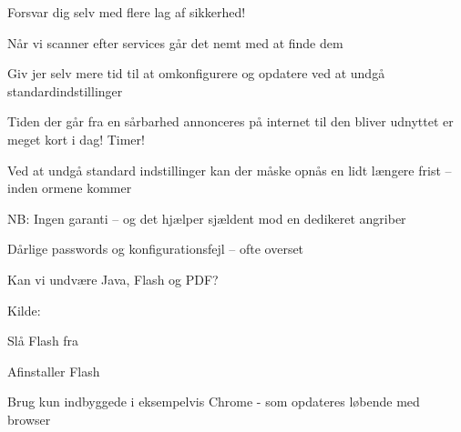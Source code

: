 \documentclass[20pt,landscape,a4paper,footrule]{foils}
\begin{document}

\centerline{Forsvar dig selv med flere lag af sikkerhed! }



\begin{list1}
\item Når vi scanner efter services går det nemt med at finde dem
\item Giv jer selv mere tid til at omkonfigurere og opdatere ved at undgå standardindstillinger
\item Tiden der går fra en sårbarhed annonceres på internet til den
  bliver udnyttet er meget kort i dag! Timer!
\item Ved at undgå standard indstillinger kan der
  måske opnås en lidt længere frist -- inden ormene kommer
\item NB: Ingen garanti -- og det hjælper sjældent mod en dedikeret angriber
\item Dårlige passwords og konfigurationsfejl -- ofte overset
\end{list1}




\vskip 1cm
\centerline{Kan vi undvære Java, Flash og PDF?}

Kilde: 





\begin{list1}
\item Slå Flash fra
\item Afinstaller Flash
\item Brug kun indbyggede i eksempelvis Chrome - som opdateres løbende med browser
\end{list1}




\centerline{}



\end{document}
